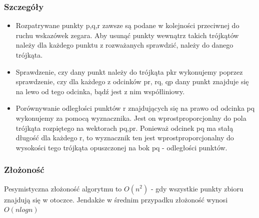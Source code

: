 \documentclass[11pt]{article}
\theoremstyle{remark} \newtheorem{definition}{def.}
\theoremstyle{definition} \newtheorem{twierdzenie}{tw.}
\begin{document}
    \subsubsection{Szczegóły}  
    \begin{itemize}
        \item   Rozpatrywane punkty p,q,r zawsze są podane w kolejności przeciwnej do ruchu wskazówek zegara.
                Aby usunąć punkty wewnątrz takich trójkątów należy dla każdego punktu z rozważanych sprawdzić,
                należy do danego trójkąta. 
        \item   Sprawdzenie, czy dany punkt należy do trójkąta pkr wykonujemy poprzez sprawdzenie, czy dla każdego
                z odcinków pr, rq, qp dany punkt znajduje się na lewo od tego odcinka, bądź jest z nim współliniowy.
        \item   Porównywanie odległości punktów r znajdujących się na prawo od odcinka pq wykonujemy za pomocą
                wyznacznika. Jest on wprostproporcjonlny do pola trójkąta rozpiętego na wektorach pq,pr. Ponieważ 
                odcinek pq ma stałą długość dla każdego r, to wyznacznik ten jest wprostproporcjonalny do wysokości tego
                trójkąta opuszczonej na bok pq - odległości punktów.
    \end{itemize}     
    \subsubsection{Złożoność}
    Pesymistyczna złożoność algorytmu to $O(n^2)$ - gdy wszystkie punkty zbioru znajdują się w otoczce. Jendakże w średnim
    przypadku złożoność wynosi $O(nlogn)$
    
\end{document}
